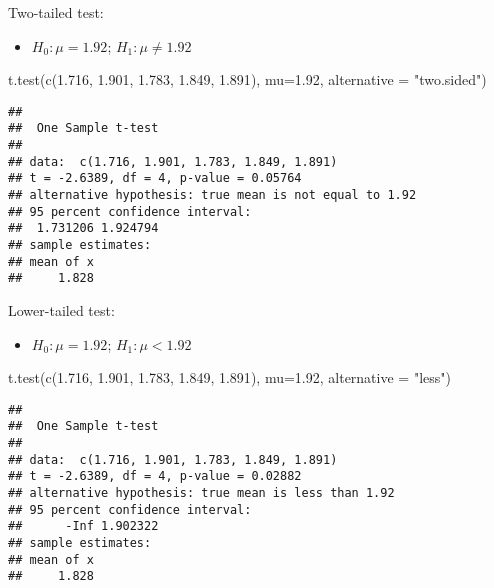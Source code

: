 \documentclass[
]{book}
\newenvironment{Shaded}{\begin{snugshade}}{\end{snugshade}}
\newcommand{\AttributeTok}[1]{\textcolor[rgb]{0.77,0.63,0.00}{#1}}
\newcommand{\FloatTok}[1]{\textcolor[rgb]{0.00,0.00,0.81}{#1}}
\newcommand{\FunctionTok}[1]{\textcolor[rgb]{0.00,0.00,0.00}{#1}}
\newcommand{\NormalTok}[1]{#1}
\newcommand{\StringTok}[1]{\textcolor[rgb]{0.31,0.60,0.02}{#1}}
\providecommand{\tightlist}{%
  \setlength{\itemsep}{0pt}\setlength{\parskip}{0pt}}
\begin{document}
Two-tailed test:

\begin{itemize}
\tightlist
\item
  \(H_0:\mu=1.92\); \(H_1:\mu \neq 1.92\)
\end{itemize}

\begin{Shaded}
\begin{Highlighting}[]
\FunctionTok{t.test}\NormalTok{(}\FunctionTok{c}\NormalTok{(}\FloatTok{1.716}\NormalTok{, }\FloatTok{1.901}\NormalTok{, }\FloatTok{1.783}\NormalTok{, }\FloatTok{1.849}\NormalTok{, }\FloatTok{1.891}\NormalTok{), }
       \AttributeTok{mu=}\FloatTok{1.92}\NormalTok{, }\AttributeTok{alternative =} \StringTok{"two.sided"}\NormalTok{)}
\end{Highlighting}
\end{Shaded}

\begin{verbatim}
## 
##  One Sample t-test
## 
## data:  c(1.716, 1.901, 1.783, 1.849, 1.891)
## t = -2.6389, df = 4, p-value = 0.05764
## alternative hypothesis: true mean is not equal to 1.92
## 95 percent confidence interval:
##  1.731206 1.924794
## sample estimates:
## mean of x 
##     1.828
\end{verbatim}

Lower-tailed test:

\begin{itemize}
\tightlist
\item
  \(H_0:\mu=1.92\); \(H_1:\mu < 1.92\)
\end{itemize}

\begin{Shaded}
\begin{Highlighting}[]
\FunctionTok{t.test}\NormalTok{(}\FunctionTok{c}\NormalTok{(}\FloatTok{1.716}\NormalTok{, }\FloatTok{1.901}\NormalTok{, }\FloatTok{1.783}\NormalTok{, }\FloatTok{1.849}\NormalTok{, }\FloatTok{1.891}\NormalTok{), }
       \AttributeTok{mu=}\FloatTok{1.92}\NormalTok{, }\AttributeTok{alternative =} \StringTok{"less"}\NormalTok{)}
\end{Highlighting}
\end{Shaded}

\begin{verbatim}
## 
##  One Sample t-test
## 
## data:  c(1.716, 1.901, 1.783, 1.849, 1.891)
## t = -2.6389, df = 4, p-value = 0.02882
## alternative hypothesis: true mean is less than 1.92
## 95 percent confidence interval:
##      -Inf 1.902322
## sample estimates:
## mean of x 
##     1.828
\end{verbatim}
\end{document}
